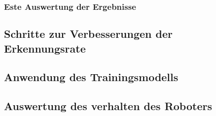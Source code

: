 \documentclass[conference]{IEEEtran}
\begin{document}
\subsubsection{Este Auswertung der Ergebnisse}	%
\subsection{Schritte zur Verbesserungen der Erkennungsrate} %
\subsection{Anwendung des Trainingsmodells } %
\subsection {Auswertung des verhalten des Roboters}
\end{document}
